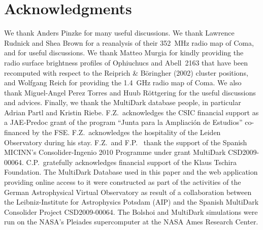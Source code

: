 \documentclass[useAMS,usenatbib]{mn2e}
\begin{document}
\section*{Acknowledgments}
We thank Anders Pinzke for many useful discussions. We thank Lawrence Rudnick
and Shea Brown for a reanalysis of their 352~MHz radio map of Coma, and for useful 
discussions. We thank Matteo Murgia for kindly providing the radio surface brightness 
profiles of Ophiuchucs and Abell~2163 that have been recomputed with respect to the 
Reiprich \& B\"{o}ringher (2002) cluster positions, and Wolfgang Reich for providing the 
1.4~GHz radio map of Coma.  We also thank Miguel-Angel Perez Torres and Huub 
R{\"o}ttgering for the useful discussions and advices.  Finally, we thank the MultiDark 
database people, in particular Adrian Partl and Kristin Riebe. 
F.Z.{\ }acknowledges the CSIC financial support as a JAE-Predoc grant of the 
program ``Junta para la Ampliaci\'on de Estudios'' co-financed by the FSE. 
F.Z.{\ }acknowledges the hospitality of the Leiden Observatory during his stay.
F.Z.{\ }and F.P.{\ } thank the support of the Spanish MICINN's Consolider-Ingenio 2010 Programme 
under grant MultiDark CSD2009-00064. C.P.{\ }gratefully acknowledges financial support
of the Klaus Tschira Foundation. The MultiDark Database used in this paper and
the web application providing online access to it were constructed as part of
the activities of the German Astrophysical Virtual Observatory as result of a
collaboration between the Leibniz-Institute for Astrophysics Potsdam (AIP) and
the Spanish MultiDark Consolider Project CSD2009-00064. The Bolshoi and
MultiDark simulations were run on the NASA's Pleiades supercomputer at the NASA
Ames Research Center.



%

\end{document}
